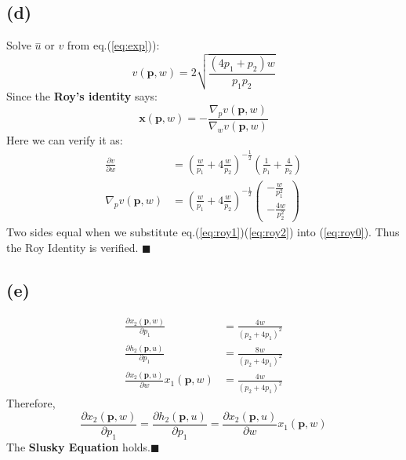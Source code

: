 \documentclass{article}
\begin{document}
\subsection{(d)}
Solve $\overset{-}{u}$ or $v$ from eq.(\ref{eq:exp})):
\begin{equation}
	v(\bm{p},w) = 2\sqrt{\frac{\left(4p_1+p_2\right)w}{p_1p_2}}
\end{equation}
Since the {\bf Roy's identity} says:
\begin{equation}
	\bm{x}(\bm{p},w) = -\frac{\nabla_{p}v(\bm{p},w)}{\nabla_{w}v(\bm{p},w)}\label{eq:roy0}
\end{equation}
Here we can verify it as:
\begin{align}
	 \frac{\partial v}{\partial w} &= (\frac{w}{p_1}+4\frac{w}{p_2})^{-\frac{1}{2}}(\frac{1}{p_1}+\frac{4}{p_2}) \label{eq:roy1}\\ 
	 \nabla_{p}v(\bm{p},w) &=(\frac{w}{p_1}+4\frac{w}{p_2})^{-\frac{1}{2}}\left(
		\begin{array}{c}
		 -\frac{w}{p^2_{1}} \\
		 -\frac{4w}{p^2_{2}}
		\end{array}
		\right) \label{eq:roy2}
\end{align}
Two sides equal when we substitute eq.(\ref{eq:roy1})(\ref{eq:roy2}) into (\ref{eq:roy0}). Thus the Roy Identity is verified. $\blacksquare$

\subsection{(e)}
\begin{align}
	\frac{\partial x_2(\bm{p},w)}{\partial p_1} &= \frac{4w}{(p_2+4p_1)^2}\\
	\frac{\partial h_2(\bm{p},u)}{\partial p_1} &= \frac{8w}{(p_2+4p_1)^2}\\
	\frac{\partial x_2(\bm{p},u)}{\partial w}x_1(\bm{p},w) &= \frac{4w}{(p_2+4p_1)^2}
\end{align}
Therefore, 
\begin{equation}
	\frac{\partial x_2(\bm{p},w)}{\partial p_1}=\frac{\partial h_2(\bm{p},u)}{\partial p_1}=\frac{\partial x_2(\bm{p},u)}{\partial w}x_1(\bm{p},w)
\end{equation}
The {\bf Slusky Equation} holds.$\blacksquare$
\end{document}
